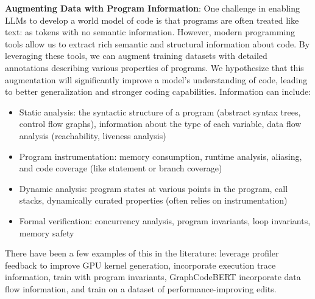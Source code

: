 \textbf{Augmenting Data with Program Information}: One challenge in enabling LLMs to develop a world model of code is that programs are often treated like text: as tokens with no semantic information. However, modern programming tools allow us to extract rich semantic and structural information about code. By leveraging these tools, we can augment training datasets with detailed annotations describing various properties of programs. We hypothesize that this augmentation will significantly improve a model’s understanding of code, leading to better generalization and stronger coding capabilities. Information can include:
\begin{itemize}
    \item Static analysis: the syntactic structure of a program (abstract syntax trees, control flow graphs), information about the type of each variable, data flow analysis (reachability, liveness analysis)
    \item Program instrumentation: memory consumption, runtime analysis, aliasing, and code coverage (like statement or branch coverage)  
    \item Dynamic analysis: program states at various points in the program, call stacks, dynamically curated properties (often relies on instrumentation)
    \item Formal verification: concurrency analysis, program invariants, loop invariants, memory safety
\end{itemize}

There have been a few examples of this in the literature: \citet{ouyang2024kernelbench} leverage profiler feedback to improve GPU kernel generation, \citet{ding2024traced, ding2024semcoder, ni2024next} incorporate execution trace information, \citet{pei2023can} train with program invariants, GraphCodeBERT \citep{guo2020graphcodebert} incorporate data flow information, and \citet{pie} train on a dataset of performance-improving edits. 


